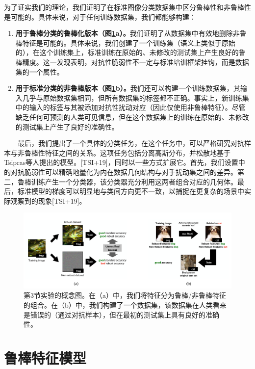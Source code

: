\documentclass{article}
\begin{document}
为了证实我们的理论，我们证明了在标准图像分类数据集中区分鲁棒性和非鲁棒性是可能的。具体来说，对于任何训练数据集，我们都能够构建：
\begin{enumerate}
  \item \textbf{用于鲁棒分类的鲁棒化版本（图\ref{fig:1}a）。}我们证明了从数据集中有效地删除非鲁棒特征是可能的。具体来说，我们创建了一个训练集（语义上类似于原始的），在这个训练集上，标准训练在原始的、未修改的测试集上产生良好的鲁棒精度。这一发现表明，对抗性脆弱性不一定与标准培训框架挂钩，而是数据集的一个属性。
  \item \textbf{用于标准分类的非鲁棒版本（图\ref{fig:1}b）。}我们还可以构建一个训练数据集，其输入几乎与原始数据集相同，但所有数据集的标签都不正确。事实上，新训练集中的输入的标签与其被添加对抗性扰动对应（因此仅使用非鲁棒特征）。尽管缺乏任何可预测的人类可见信息，但在这个数据集上的训练在原始的、未修改的测试集上产生了良好的准确性。
\end{enumerate}

\ \ \ \ 最后，我们提出了一个具体的分类任务，在这个任务中，可以严格研究对抗样本与非鲁棒性特征之间的关系。这项任务包括分离高斯分布，并松散地基于Tsipras等人提出的模型。[TSI+19]，同时以一些方式扩展它。首先，我们设置中的对抗脆弱性可以精确地量化为内在数据几何结构与对手扰动集之间的差异。第二，鲁棒训练产生一个分类器，该分类器充分利用这两者组合对应的几何体。最后，标准模型的梯度可以明显地与类间方向更不一致，以捕捉在更复杂的场景中实际观察到的现象[TSI+19]。

\begin{figure}[h]
  \centering
  \includegraphics[width=13cm]{fig/figure1.png}
  \caption{第3节实验的概念图。在（a）中，我们将特征分为鲁棒/非鲁棒特征的组合。在（b）中，我们构建了一个数据集，该数据集在人类看来是错误的（通过对抗样本），但在最初的测试集上具有良好的准确性。}
  \label{fig:1}
\end{figure}

\section{鲁棒特征模型}  \label{section:2}
\end{document}

